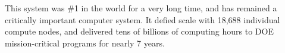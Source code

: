 
This system was \#1 in the world for a very long time, and has remained
a critically important computer system. It defied scale with 18,688
individual compute nodes, and delivered tens of billions of computing
hours to DOE mission-critical programs for nearly 7 years. 
